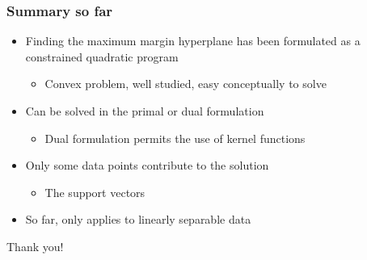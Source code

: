 \documentclass[12pt,notes,mathserif]{beamer}
\newcommand{\chuhao}{\fontsize{44.9pt}{\baselineskip}\selectfont}
\begin{document}
\begin{frame}[c]
\frametitle{Summary so far}
\begin{itemize}
\item Finding the maximum margin hyperplane has been formulated as a constrained quadratic program
\begin{itemize}
\item Convex problem, well studied, easy conceptually to solve
\end{itemize}
\item Can be solved in the primal or dual formulation
\begin{itemize}
\item Dual formulation permits the use of kernel functions
\end{itemize}
\item Only some data points contribute to the solution
\begin{itemize}
\item The support vectors
\end{itemize}
\item So far, only applies to linearly separable data
\end{itemize}
\end{frame}



\begin{frame}
\begin{center}
\chuhao Thank you! %
\end{center}
\end{frame}
\end{document}
